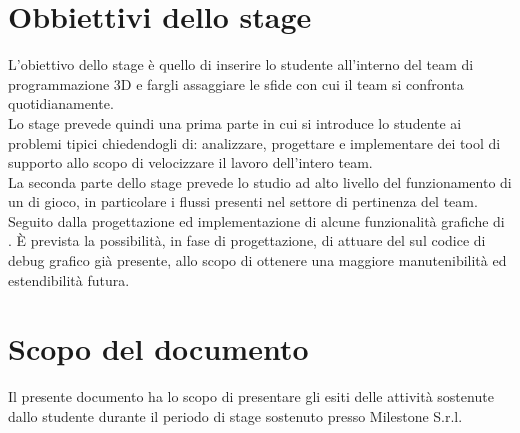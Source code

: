 \section{Obbiettivi dello stage}

L'obiettivo dello stage è quello di inserire lo studente all'interno del team di programmazione 3D e fargli assaggiare le sfide con cui il team si confronta quotidianamente.\\

Lo stage prevede quindi una prima parte in cui si introduce lo studente ai problemi tipici chiedendogli di: analizzare, progettare e implementare dei tool di supporto allo scopo di velocizzare il lavoro dell'intero team.\\

La seconda parte dello stage prevede lo studio ad alto livello del funzionamento di un  di gioco, in particolare i flussi presenti nel settore di pertinenza del team. Seguito dalla progettazione ed implementazione di alcune funzionalità grafiche di . È prevista la possibilità, in fase di progettazione, di attuare del  sul codice di debug grafico già presente, allo scopo di ottenere una maggiore manutenibilità ed estendibilità futura.

\section{Scopo del documento}

Il presente documento ha lo scopo di presentare gli esiti delle attività sostenute dallo studente durante il periodo di stage sostenuto presso Milestone S.r.l.\\

